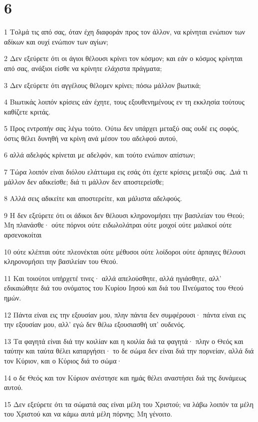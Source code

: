 \chapter{6}

\par 1 Τολμά τις από σας, όταν έχη διαφοράν προς τον άλλον, να κρίνηται ενώπιον των αδίκων και ουχί ενώπιον των αγίων;
\par 2 Δεν εξεύρετε ότι οι άγιοι θέλουσι κρίνει τον κόσμον; και εάν ο κόσμος κρίνηται από σας, ανάξιοι είσθε να κρίνητε ελάχιστα πράγματα;
\par 3 Δεν εξεύρετε ότι αγγέλους θέλομεν κρίνει; πόσω μάλλον βιωτικά;
\par 4 Βιωτικάς λοιπόν κρίσεις εάν έχητε, τους εξουθενημένους εν τη εκκλησία τούτους καθίζετε κριτάς.
\par 5 Προς εντροπήν σας λέγω τούτο. Ούτω δεν υπάρχει μεταξύ σας ουδέ εις σοφός, όστις θέλει δυνηθή να κρίνη ανά μέσον του αδελφού αυτού,
\par 6 αλλά αδελφός κρίνεται με αδελφόν, και τούτο ενώπιον απίστων;
\par 7 Τώρα λοιπόν είναι διόλου ελάττωμα εις εσάς ότι έχετε κρίσεις μεταξύ σας. Διά τι μάλλον δεν αδικείσθε; διά τι μάλλον δεν αποστερείσθε;
\par 8 Αλλά σεις αδικείτε και αποστερείτε, και μάλιστα αδελφούς.
\par 9 Η δεν εξεύρετε ότι οι άδικοι δεν θέλουσι κληρονομήσει την βασιλείαν του Θεού; Μη πλανάσθε· ούτε πόρνοι ούτε ειδωλολάτραι ούτε μοιχοί ούτε μαλακοί ούτε αρσενοκοίται
\par 10 ούτε κλέπται ούτε πλεονέκται ούτε μέθυσοι ούτε λοίδοροι ούτε άρπαγες θέλουσι κληρονομήσει την βασιλείαν του Θεού.
\par 11 Και τοιούτοι υπήρχετέ τινες· αλλά απελούσθητε, αλλά ηγιάσθητε, αλλ' εδικαιώθητε διά του ονόματος του Κυρίου Ιησού και διά του Πνεύματος του Θεού ημών.
\par 12 Πάντα είναι εις την εξουσίαν μου, πλην πάντα δεν συμφέρουσι· πάντα είναι εις την εξουσίαν μου, αλλ' εγώ δεν θέλω εξουσιασθή υπ' ουδενός.
\par 13 Τα φαγητά είναι διά την κοιλίαν και η κοιλία διά τα φαγητά· πλην ο Θεός και ταύτην και ταύτα θέλει καταργήσει· το δε σώμα δεν είναι διά την πορνείαν, αλλά διά τον Κύριον, και ο Κύριος διά το σώμα·
\par 14 ο δε Θεός και τον Κύριον ανέστησε και ημάς θέλει αναστήσει διά της δυνάμεως αυτού.
\par 15 Δεν εξεύρετε ότι τα σώματά σας είναι μέλη του Χριστού; να λάβω λοιπόν τα μέλη του Χριστού και να κάμω αυτά μέλη πόρνης; Μη γένοιτο.
